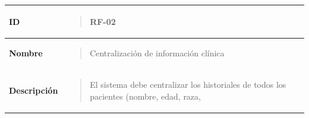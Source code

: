 \documentclass[
]{article}
\newcounter{none} %
\begin{document}
{\def\LTcaptype{none} %
\begin{longtable}[]{@{}
  >{\raggedright\arraybackslash}p{}
  >{\raggedright\arraybackslash}p{}@{}}
\toprule\noalign{}
\begin{minipage}[b]{\linewidth}\raggedright
\textbf{ID}
\end{minipage} & \begin{minipage}[b]{\linewidth}\raggedright
\begin{quote}
RF-02
\end{quote}
\end{minipage} \\
\midrule\noalign{}
\endhead
\bottomrule\noalign{}
\endlastfoot
\textbf{Nombre} & \begin{minipage}[t]{\linewidth}\raggedright
\begin{quote}
Centralización de información clínica
\end{quote}
\end{minipage} \\
\textbf{Descripción} & \begin{minipage}[t]{\linewidth}\raggedright
\begin{quote}
El sistema debe centralizar los historiales de todos los pacientes
(nombre, edad, raza,


\end{quote}
\end{minipage}
\end{longtable}}
\end{document}
